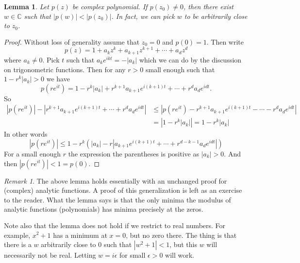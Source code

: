 \documentclass[12pt]{book}
\newcommand{\abs}[1]{\left\lvert {#1} \right\rvert}
\newcommand{\C}{{\mathbb{C}}}
\theoremstyle{plain}
\newtheorem{lemma}[thm]{Lemma}
\theoremstyle{remark}
\newtheorem{remark}[thm]{Remark}
\theoremstyle{definition}
\theoremstyle{exercise}
\theoremstyle{example}
\begin{document}
\begin{lemma}
Let $p(z)$ be complex polynomial.  If $p(z_0) \not= 0$, then there
exist $w \in \C$ such that $\abs{p(w)} < \abs{p(z_0)}$.  In fact,
we can pick $w$ to be arbitrarily close to $z_0$.
\end{lemma}

\begin{proof}
Without loss of generality assume that $z_0 = 0$ and $p(0) = 1$.  Then write
\begin{equation*}
p(z) = 1+a_kz^k + a_{k+1}z^{k+1} + \cdots + a_d z^d
\end{equation*}
where $a_k \not= 0$.  Pick $t$ such that $a_k e^{ikt} = -\abs{a_k}$ which
we can do by the discussion on trigonometric functions.  Then for
any $r > 0$ small enough such that
$1-r^k \abs{a_k} > 0$ we have
\begin{equation*}
p(r e^{it}) =
1-r^k \abs{a_k} + r^{k+1}a_{k+1}e^{i(k+1)t} + \cdots + r^{d}a_{d}e^{idt} .
\end{equation*}
So
\begin{equation*}
\begin{split}
\abs{
p(r e^{it}) } - \abs{
r^{k+1}a_{k+1}e^{i(k+1)t} + \cdots + r^{d}a_{d}e^{idt}
}
& \leq
\abs{
p(r e^{it}) 
- r^{k+1}a_{k+1}e^{i(k+1)t} - \cdots - r^{d}a_{d}e^{idt}
}
\\
& =
\abs{
1-r^k \abs{a_k}
}
=
1-r^k \abs{a_k}
\end{split}
\end{equation*}
In other words
$$
\abs{
p(r e^{it}) }
\leq
1-r^k \left( \abs{a_k}
-
r
\abs{
a_{k+1}e^{i(k+1)t} + \cdots + r^{d-k-1}a_{d}e^{idt}
}
\right)
$$
For a small enough $r$ the expression the parentheses is positive
as $\abs{a_k} > 0$.  And then $\abs{p(re^{it})} < 1 = p(0)$.
\end{proof}

\begin{remark}
The above lemma holds essentially with an unchanged proof for (complex) analytic
functions.  A proof of this generalization is left as an exercise to the reader.
What the lemma
says is that the only minima the modulus of analytic functions (polynomials)
has minima precisely at the zeros.

Note also that the lemma does not hold if we restrict to real numbers.  For
example, $x^2+1$ has a minimum at $x=0$, but no zero there.  The thing is that
there is a $w$ arbitrarily close to $0$ such that $\abs{w^2+1} < 1$, but this
$w$ will necessarily not be real.  Letting $w = i\epsilon$ for small
$\epsilon > 0$ will work.
\end{remark}
\end{document}
